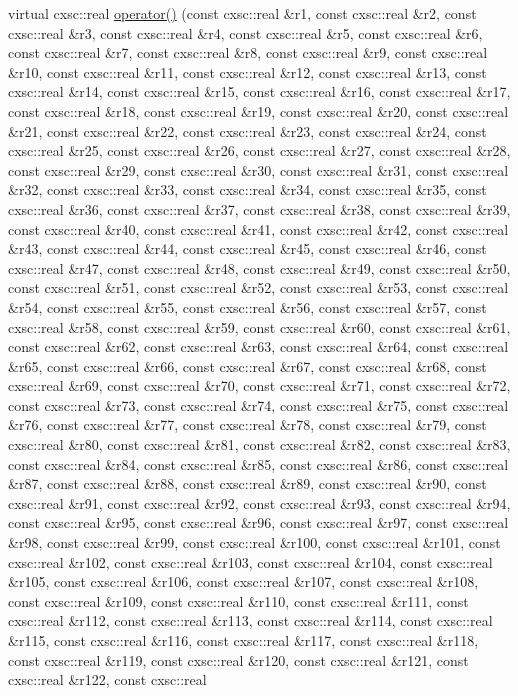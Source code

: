\begin{DoxyCompactItemize}
virtual cxsc\-::real \hyperlink{classRosenFobj1000D_a7c7b469000d7db79db8b30e6a33dec1a}{operator()} (const cxsc\-::real \&r1, const cxsc\-::real \&r2, const cxsc\-::real \&r3, const cxsc\-::real \&r4, const cxsc\-::real \&r5, const cxsc\-::real \&r6, const cxsc\-::real \&r7, const cxsc\-::real \&r8, const cxsc\-::real \&r9, const cxsc\-::real \&r10, const cxsc\-::real \&r11, const cxsc\-::real \&r12, const cxsc\-::real \&r13, const cxsc\-::real \&r14, const cxsc\-::real \&r15, const cxsc\-::real \&r16, const cxsc\-::real \&r17, const cxsc\-::real \&r18, const cxsc\-::real \&r19, const cxsc\-::real \&r20, const cxsc\-::real \&r21, const cxsc\-::real \&r22, const cxsc\-::real \&r23, const cxsc\-::real \&r24, const cxsc\-::real \&r25, const cxsc\-::real \&r26, const cxsc\-::real \&r27, const cxsc\-::real \&r28, const cxsc\-::real \&r29, const cxsc\-::real \&r30, const cxsc\-::real \&r31, const cxsc\-::real \&r32, const cxsc\-::real \&r33, const cxsc\-::real \&r34, const cxsc\-::real \&r35, const cxsc\-::real \&r36, const cxsc\-::real \&r37, const cxsc\-::real \&r38, const cxsc\-::real \&r39, const cxsc\-::real \&r40, const cxsc\-::real \&r41, const cxsc\-::real \&r42, const cxsc\-::real \&r43, const cxsc\-::real \&r44, const cxsc\-::real \&r45, const cxsc\-::real \&r46, const cxsc\-::real \&r47, const cxsc\-::real \&r48, const cxsc\-::real \&r49, const cxsc\-::real \&r50, const cxsc\-::real \&r51, const cxsc\-::real \&r52, const cxsc\-::real \&r53, const cxsc\-::real \&r54, const cxsc\-::real \&r55, const cxsc\-::real \&r56, const cxsc\-::real \&r57, const cxsc\-::real \&r58, const cxsc\-::real \&r59, const cxsc\-::real \&r60, const cxsc\-::real \&r61, const cxsc\-::real \&r62, const cxsc\-::real \&r63, const cxsc\-::real \&r64, const cxsc\-::real \&r65, const cxsc\-::real \&r66, const cxsc\-::real \&r67, const cxsc\-::real \&r68, const cxsc\-::real \&r69, const cxsc\-::real \&r70, const cxsc\-::real \&r71, const cxsc\-::real \&r72, const cxsc\-::real \&r73, const cxsc\-::real \&r74, const cxsc\-::real \&r75, const cxsc\-::real \&r76, const cxsc\-::real \&r77, const cxsc\-::real \&r78, const cxsc\-::real \&r79, const cxsc\-::real \&r80, const cxsc\-::real \&r81, const cxsc\-::real \&r82, const cxsc\-::real \&r83, const cxsc\-::real \&r84, const cxsc\-::real \&r85, const cxsc\-::real \&r86, const cxsc\-::real \&r87, const cxsc\-::real \&r88, const cxsc\-::real \&r89, const cxsc\-::real \&r90, const cxsc\-::real \&r91, const cxsc\-::real \&r92, const cxsc\-::real \&r93, const cxsc\-::real \&r94, const cxsc\-::real \&r95, const cxsc\-::real \&r96, const cxsc\-::real \&r97, const cxsc\-::real \&r98, const cxsc\-::real \&r99, const cxsc\-::real \&r100, const cxsc\-::real \&r101, const cxsc\-::real \&r102, const cxsc\-::real \&r103, const cxsc\-::real \&r104, const cxsc\-::real \&r105, const cxsc\-::real \&r106, const cxsc\-::real \&r107, const cxsc\-::real \&r108, const cxsc\-::real \&r109, const cxsc\-::real \&r110, const cxsc\-::real \&r111, const cxsc\-::real \&r112, const cxsc\-::real \&r113, const cxsc\-::real \&r114, const cxsc\-::real \&r115, const cxsc\-::real \&r116, const cxsc\-::real \&r117, const cxsc\-::real \&r118, const cxsc\-::real \&r119, const cxsc\-::real \&r120, const cxsc\-::real \&r121, const cxsc\-::real \&r122, const cxsc\-::real 
\end{DoxyCompactItemize}
